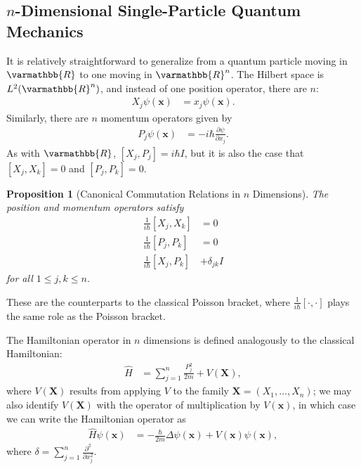 \documentclass[12pt]{extarticle}
\newcommand{\R}{\varmathbb{R}}
\theoremstyle{plain}
\newtheorem*{proposition}{Proposition}%
\theoremstyle{definition}
\theoremstyle{remark}
\renewcommand{\newline}{\hfill\break}
\begin{document}
  \subsection{$n$-Dimensional Single-Particle Quantum Mechanics}%
  It is relatively straightforward to generalize from a quantum particle moving in $\R$ to one moving in $\R^n$. The Hilbert space is $L^{2}(\R^n)$, and instead of one position operator, there are $n$:
  \begin{align*}
    X_j\psi(\mathbf{x}) &= x_j\psi(\mathbf{x}).
  \end{align*}
  Similarly, there are $n$ momentum operators given by
  \begin{align*}
    P_j\psi(\mathbf{x}) &= -i\hbar \frac{\partial \psi}{\partial x_j}.
  \end{align*}
  As with $\R$, $[X_j,P_j] = i\hbar I$, but it is also the case that $[X_j,X_k] = 0$ and $[P_j,P_k] = 0$.
  \begin{proposition}[Canonical Commutation Relations in $n$ Dimensions]
    The position and momentum operators satisfy
    \begin{align*}
      \frac{1}{i\hbar}[X_j,X_k] &= 0\\
      \frac{1}{i\hbar}[P_j,P_k] &= 0\\
      \frac{1}{i\hbar}[X_j,P_k] &+ \delta_{jk}I
    \end{align*}
    for all $1 \leq j,k \leq n$.
  \end{proposition}
  These are the counterparts to the classical Poisson bracket, where $\frac{1}{i\hbar}[\cdot,\cdot]$ plays the same role as the Poisson bracket.\newline

  The Hamiltonian operator in $n$ dimensions is defined analogously to the classical Hamiltonian:
  \begin{align*}
    \hat{H} &= \sum_{j=1}^{n}\frac{P_j^2}{2m} + V(\mathbf{X}),
  \end{align*}
  where $V(\mathbf{X})$ results from applying $V$ to the family $\mathbf{X} = (X_1,\dots,X_n)$; we may also identify $V(\mathbf{X})$ with the operator of multiplication by $V(\mathbf{x})$, in which case we can write the Hamiltonian operator as
  \begin{align*}
    \hat{H}\psi(\mathbf{x}) &= -\frac{\hbar}{2m}\Delta \psi(\mathbf{x}) + V(\mathbf{x})\psi(\mathbf{x}),
  \end{align*}
  where $\delta = \sum_{j=1}^{n}\frac{\partial^2}{\partial x_j^2}$.\newline
\end{document}

